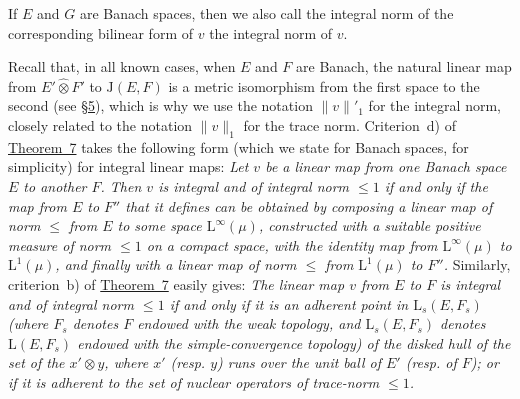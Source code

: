 \documentclass{article}
\theoremstyle{plain}
\newcommand{\LL}{\mathrm{L}}
\newcommand{\JJ}{\mathrm{J}}
\newcommand{\hotimes}{\widehat{\otimes}}
\begin{document}
If $E$ and $G$ are Banach spaces, then we also call the integral norm of the corresponding bilinear form of $v$ the integral norm of $v$.

Recall that, in all known cases, when $E$ and $F$ are Banach, the natural linear map from $E'\hotimes F'$ to $\JJ(E,F)$ is a metric isomorphism from the first space to the second (see \hyperref[1.5]{\S5}), which is why we use the notation $\|v\|'_1$ for the integral norm, closely related to the notation $\|v\|_1$ for the trace norm.
Criterion~d) of \hyperref[1.theorem7]{Theorem~7} takes the following form (which we state for Banach spaces, for simplicity) for integral linear maps:
\emph{Let $v$ be a linear map from one Banach space $E$ to another $F$. Then $v$ is integral and of integral norm $\leq1$ if and only if the map from $E$ to $F''$ that it defines can be obtained by composing a linear map of norm $\leq$ from $E$ to some space $\LL^\infty(\mu)$, constructed with a suitable positive measure of norm $\leq1$ on a compact space, with the identity map from $\LL^\infty(\mu)$ to $\LL^1(\mu)$, and finally with a linear map of norm $\leq$ from $\LL^1(\mu)$ to $F''$.}
Similarly, criterion~b) of \hyperref[1.theorem7]{Theorem~7} easily gives:
\emph{The linear map $v$ from $E$ to $F$ is integral and of integral norm $\leq1$ if and only if it is an adherent point in $\LL_s(E,F_s)$ (where $F_s$ denotes $F$ endowed with the weak topology, and $\LL_s(E,F_s)$ denotes $\LL(E,F_s)$ endowed with the simple-convergence topology) of the disked hull of the set of the $x'\otimes y$, where $x'$ (resp. $y$) runs over the unit ball of $E'$ (resp. of $F$); or if it is adherent to the set of nuclear operators of trace-norm $\leq1$.}
\end{document}
